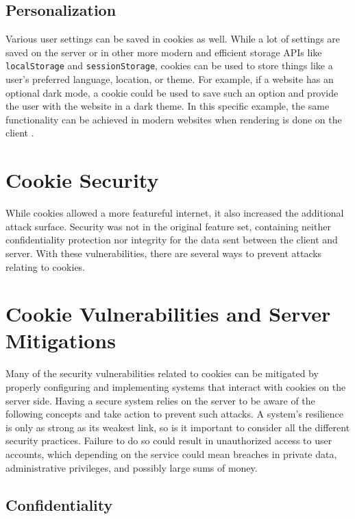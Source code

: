 \documentclass[conference,12pt]{IEEEtran}
\begin{document}
\subsection{Personalization}

Various user settings can be saved in cookies as well.  While a lot of settings
are saved on the server or in other more modern and efficient storage APIs like
\lstinline{localStorage} and \lstinline{sessionStorage}, cookies can be used to
store things like a user’s preferred language, location, or theme.  For example,
if a website has an optional dark mode, a cookie could be used to save such an
option and provide the user with the website in a dark theme.  In this specific
example, the same functionality can be achieved in modern websites when
rendering is done on the client \cite{b2}.

\section{Cookie Security}

While cookies allowed a more featureful internet, it also increased the
additional attack surface.  Security was not in the original feature set,
containing neither confidentiality protection nor integrity for the data sent
between the client and server.  With these vulnerabilities, there are several
ways to prevent attacks relating to cookies. 

\section{Cookie Vulnerabilities and Server Mitigations}

Many of the security vulnerabilities related to cookies can be mitigated by
properly configuring and implementing systems that interact with cookies on the
server side.  Having a secure system relies on the server to be aware of the
following concepts and take action to prevent such attacks.  A system’s
resilience is only as strong as its weakest link, so is it important to consider
all the different security practices.  Failure to do so could result in
unauthorized access to user accounts, which depending on the service could mean
breaches in private data, administrative privileges, and possibly large sums of
money.  

\subsection{Confidentiality}
\end{document}
